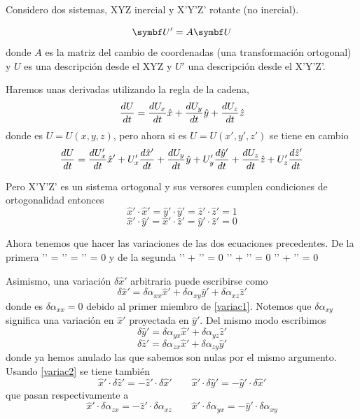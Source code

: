 \documentclass[10pt,oneside]{CBFT_book}
\begin{document}
Considero dos sistemas, XYZ inercial y X'Y'Z' rotante (no inercial).

\[
	\vb{U}' = A \vb{U} 
\]
donde $A$ es la matriz del cambio de coordenadas (una transformación ortogonal) y $U$ es una descripción
desde el XYZ y $U'$ una descripción desde el X'Y'Z'.

Haremos unas derivadas utilizando la regla de la cadena,
\[
	\frac{d^{\hspace{-0.05em}} {U}}{d {t}^{\hspace{-0.05em}}} = \frac{d^{\hspace{-0.05em}} {U_x}}{d {t}^{\hspace{-0.05em}}}\hat{x} + \frac{d^{\hspace{-0.05em}} {U_y}}{d {t}^{\hspace{-0.05em}}}\hat{y} + \frac{d^{\hspace{-0.05em}} {U_z}}{d {t}^{\hspace{-0.05em}}}\hat{z} 
\]
donde es $U = U(x,y,z)$, pero ahora si es $U = U(x',y',z')$ se tiene en cambio
\[
	\frac{d^{\hspace{-0.05em}} {U}}{d {t}^{\hspace{-0.05em}}} = \frac{d^{\hspace{-0.05em}} {U_x'}}{d {t}^{\hspace{-0.05em}}}\hat{x}' + U_x' \frac{d^{\hspace{-0.05em}} {\hat{x}'}}{d {t}^{\hspace{-0.05em}}} + 
	\frac{d^{\hspace{-0.05em}} {U_y}}{d {t}^{\hspace{-0.05em}}}\hat{y} + U_y' \frac{d^{\hspace{-0.05em}} {\hat{y}'}}{d {t}^{\hspace{-0.05em}}} + \frac{d^{\hspace{-0.05em}} {U_z}}{d {t}^{\hspace{-0.05em}}}\hat{z} + U_z' \frac{d^{\hspace{-0.05em}} {\hat{z}'}}{d {t}^{\hspace{-0.05em}}}
\]

Pero X'Y'Z' es un sistema ortogonal y sus versores cumplen condiciones de ortogonalidad entonces
\[
	\hat{x}'\cdot\hat{x}' = \hat{y}'\cdot\hat{y}' = \hat{z}'\cdot\hat{z}' = 1
\]
\[
	\hat{x}'\cdot\hat{y}' = \hat{x}'\cdot\hat{z}' = \hat{y}'\cdot\hat{z}' = 0
\]

Ahora tenemos que hacer las variaciones de las dos ecuaciones precedentes. De la primera
\be
	 '\cdot\delta{}' = '\cdot\delta{}' = '\cdot\delta{}' = 0
\label{variac1}	 
\ee
y de la segunda
\be
	'\cdot\delta{}' + '\cdot\delta{}' = 0 \qquad \qquad 
	'\cdot\delta{}' + '\cdot\delta{}' = 0 \qquad \qquad 
	'\cdot\delta{}' + '\cdot\delta{}' = 0 \qquad \qquad 
\label{variac2}	
\ee

Asimismo, una variación $\delta\hat{x}'$ arbitraria puede escribirse como
\[
	\delta\hat{x}' = \delta \alpha_{xx}\hat{x}' + \delta \alpha_{xy}\hat{y}' + \delta \alpha_{xz}\hat{z}' 
\]
donde es $\delta \alpha_{xx}=0$ debido al primer miembro de \eqref{variac1}. Notemos que $\delta \alpha_{xy}$ significa
una variación en $\hat{x}'$ proyectada en $\hat{y}'$. Del mismo modo escribimos
\[
	\delta\hat{y}' = \delta \alpha_{yx}\hat{x}' + \delta \alpha_{yz}\hat{z}' 
\]
\[
	\delta\hat{z}' = \delta \alpha_{zx}\hat{x}' + \delta \alpha_{zy}\hat{y}' 
\]
donde ya hemos anulado las que sabemos son nulas por el mismo argumento. Usando \eqref{variac2} se tiene también
\[
	\hat{x}'\cdot\delta\hat{z}' =  - \hat{z}'\cdot\delta\hat{x}' \qquad 
	\hat{x}'\cdot\delta\hat{y}' =  - \hat{y}'\cdot\delta\hat{x}'
\]
que pasan respectivamente a
\[
	\hat{x}'\cdot\delta\alpha_{zx} =  - \hat{z}'\cdot\delta\alpha_{xz} \qquad 
	\hat{x}'\cdot\delta\alpha_{yx} =  - \hat{y}'\cdot\delta\alpha_{xy}
\]
\end{document}
